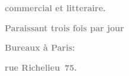 \pstart
           \begin{otherlanguage}{french}\textcolor{gray}{\textbf{commercial et litteraire.}}\end{otherlanguage}\pend
           
\pstart
           \begin{otherlanguage}{french}\textcolor{gray}{\textbf{\textbf{Paraissant trois fois par jour}}}\end{otherlanguage}\pend
           
\pstart
           \begin{otherlanguage}{french}\textcolor{gray}{\textbf{\textbf{Bureaux à Paris:}}}\end{otherlanguage}\pend
           
\pstart
           \begin{otherlanguage}{french}\textcolor{gray}{\textbf{\textbf{rue Richelieu 75.}}}\end{otherlanguage}\pend
           
